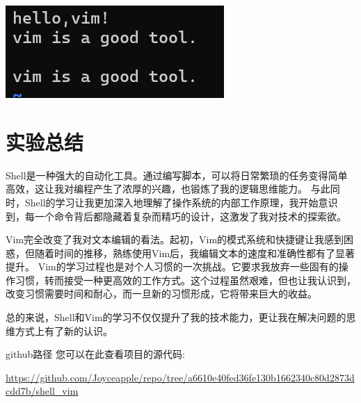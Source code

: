 \documentclass{article}
\begin{document}
	\noindent
	\begin{minipage}{\linewidth}
		\centering
		\includegraphics[width=0.5\linewidth]{example22.png}
		\label{fig:example}
	\end{minipage}
	
	
	
	
	\section{实验总结}
	Shell是一种强大的自动化工具。通过编写脚本，可以将日常繁琐的任务变得简单高效，这让我对编程产生了浓厚的兴趣，也锻炼了我的逻辑思维能力。
	与此同时，Shell的学习让我更加深入地理解了操作系统的内部工作原理，我开始意识到，每一个命令背后都隐藏着复杂而精巧的设计，这激发了我对技术的探索欲。
	
	Vim完全改变了我对文本编辑的看法。起初，Vim的模式系统和快捷键让我感到困惑，但随着时间的推移，熟练使用Vim后，我编辑文本的速度和准确性都有了显著提升。
	Vim的学习过程也是对个人习惯的一次挑战。它要求我放弃一些固有的操作习惯，转而接受一种更高效的工作方式。这个过程虽然艰难，但也让我认识到，改变习惯需要时间和耐心，而一旦新的习惯形成，它将带来巨大的收益。
	
	总的来说，Shell和Vim的学习不仅仅提升了我的技术能力，更让我在解决问题的思维方式上有了新的认识。
	
	github路径
	您可以在此查看项目的源代码: 
	
	\url{https://github.com/Joyceapple/repo/tree/a6610e40fed36fe130b1662340c80d2873dcdd7b/shell_vim}
\end{document}
